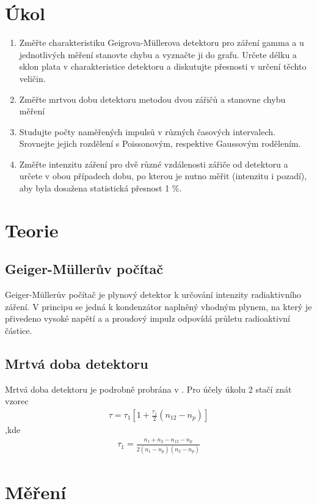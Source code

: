 \documentclass[a4paper,12pt]{article}
\begin{document}
\section{Úkol}
\begin{enumerate}
\item Změřte charakteristiku Geigrova-Müllerova detektoru pro záření gamma a u jednotlivých měření stanovte chybu a vyznačte ji do grafu. Určete délku a sklon plata v charakteristice detektoru a diskutujte přesnosti v určení těchto veličin.
\item Změřte mrtvou dobu detektoru metodou dvou zářičů a stanovne chybu měření
\item Studujte počty naměřených impulsů v různých časových intervalech. Srovnejte jejich rozdělení s Poissonovým, respektive Gaussovým rodělením.
\item Změřte intenzitu záření pro dvě různé vzdálenosti zářiče od detektoru a určete v obou případech dobu, po kterou je nutno měřit (intenzitu i pozadí), aby byla dosažena statistická přesnost 1 \%.
\end{enumerate}

\section{Teorie}
\subsection{Geiger-Müllerův počítač}
Geiger-Müllerův počítač je plynový detektor k určování intenzity radiaktivního záření. V principu se jedná k kondenzátor naplněný vhodným plynem, na který je přivedeno vysoké napětí a a proudový impulz odpovídá průletu radioaktivní částice.

\subsection{Mrtvá doba detektoru}
Mrtvá doba detektoru je podrobně probrána v \cite{text}. Pro účely úkolu 2 stačí znát vzorec
\begin{eqnarray}
\tau=\tau_1\left[1+\frac{\tau_1}{2}(n_{12}-n_p)\right]
\label{md}
\end{eqnarray}
,kde
\begin{eqnarray}
\tau_1=\frac{n_1+n_2-n_{12}-n_p}{2(n_1-n_p)(n_2-n_p)}
\end{eqnarray}

\section{Měření}
\end{document}
